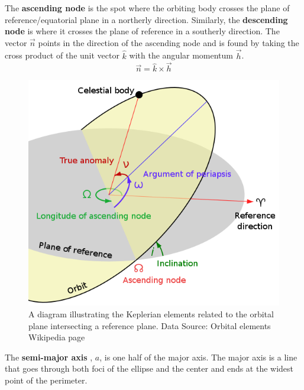 \documentclass[a4paper, 12pt]{article}
\newcommand{\lindex}[1]{%
	\lowercase{\def\temp{#1}}%
	\expandafter\index\expandafter{\temp}%
}
\newcommand{\boldindex}[1]{%
	\textbf{#1}\lindex{#1}%
}
\begin{document}
The \boldindex{ascending node} is the spot where the orbiting body crosses the plane of reference/equatorial plane in a northerly direction. Similarly, the \boldindex{descending node} is where it crosses the plane of reference in a southerly direction. The vector $\vec{n}$ points in the direction of the ascending node and is found by taking the cross product of the unit vector $\hat{k}$ with the angular momentum $\vec{h}$.
\begin{equation}
\vec{n} = \hat{k} \times \vec{h}
\end{equation}

\begin{figure}[t]
	\centering
	\includegraphics[scale=0.35]{keplerian-elements}
	\caption{A diagram illustrating the Keplerian elements related to the orbital plane intersecting a reference plane. Data Source: Orbital elements Wikipedia page }
\end{figure}

The \boldindex{semi-major axis}, $a$,  is one half of the major axis. The major axis is a line that goes through both foci of the ellipse and the center and ends at the widest point of the perimeter.
\end{document}
